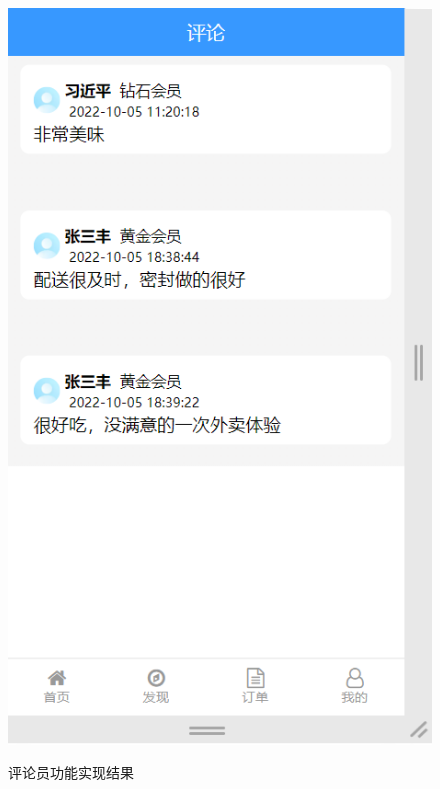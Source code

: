 \begin{figure}[H]
{\begin{minipage}[t]{0.48\linewidth}
            \includegraphics[scale=0.5]{figures/5.1.5.png}\\
        \end{minipage}
    }
    \centering
    \caption{评论员功能实现结果}
\end{figure}


